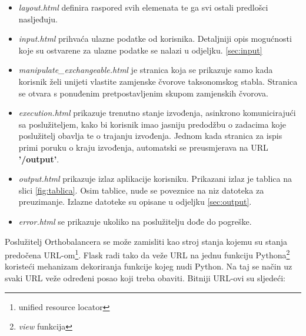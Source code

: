 \begin{itemize}

    \item \emph{layout.html} definira raspored svih elemenata te ga svi ostali
predlošci nasljeđuju.

    \item \emph{input.html} prihvaća ulazne podatke od korisnika. Detaljniji
opis mogućnosti koje su ostvarene za ulazne podatke se nalazi u odjeljku.
\ref{sec:input}

    \item \emph{manipulate\_exchangeable.html} je stranica koja se prikazuje
samo kada korisnik želi unijeti vlastite zamjenske čvorove taksonomskog stabla.
Stranica se otvara s ponuđenim pretpostavljenim skupom zamjenskih čvorova.

    \item \emph{execution.html}  prikazuje trenutno stanje izvođenja, asinkrono
komunicirajući sa poslužiteljem, kako bi korisnik imao jasniju predodžbu o
zadacima koje poslužitelj obavlja te o trajanju izvođenja. Jednom kada stranica
za ispis primi poruku o kraju izvođenja, automatski se preusmjerava na URL
\textbf{'/output'}.

    \item \emph{output.html} prikazuje izlaz aplikacije korisniku. Prikazani
izlaz je tablica na slici \ref{fig:tablica}. Osim tablice, nude se poveznice na
niz datoteka za preuzimanje. Izlazne datoteke su opisane u odjeljku
\ref{sec:output}.

    \item \emph{error.html} se prikazuje ukoliko na poslužitelju dođe do
pogreške.

\end{itemize}

Poslužitelj Orthobalancera se može zamisliti kao stroj stanja kojemu su stanja
predočena URL-om\footnote{unified resource locator}. Flask radi tako da veže
URL na jednu funkciju Pythona\footnote{\emph{view} funkcija} koristeći
mehanizam dekoriranja funkcije kojeg nudi Python\cite{pep}. Na taj se način uz
svaki URL veže određeni posao koji treba obaviti. Bitniji URL-ovi su sljedeći:

